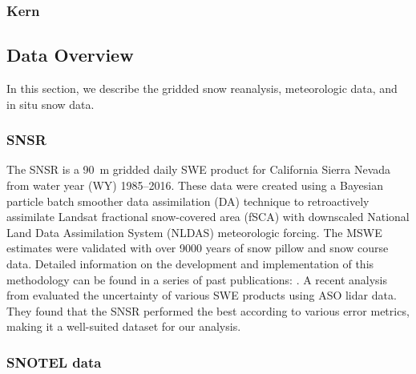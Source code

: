 \hypertarget{ch2-sa-3}{\subsubsection{Kern}\label{ch2-sa-3}}


\hypertarget{ch2-do-1}{\subsection{Data Overview}\label{ch2-do-1}}

In this section, we describe the gridded snow reanalysis, meteorologic data, and in situ snow data.

\hypertarget{ch2-do-2}{\subsubsection{SNSR}\label{ch2-do-2}}


The SNSR \citep{margulisLandsatEraSierraNevada2016} is a 90~m gridded daily SWE product for California Sierra Nevada from water year (WY) 1985--2016. These data were created using a Bayesian particle batch smoother data assimilation (DA) technique to retroactively assimilate Landsat fractional snow-covered area (fSCA) with downscaled National Land Data Assimilation System (NLDAS) meteorologic forcing. The MSWE estimates were validated with over 9000 years of snow pillow and snow course data. Detailed information on the development and implementation of this methodology can be found in a series of past publications: \cite{durandBayesianApproachSnow2008, girottoExaminingSpatialTemporal2014, girottoProbabilisticSWEReanalysis2014, margulisParticleBatchSmoother2015}. A recent analysis from \citep{yangIntercomparisonSnowWater2023} evaluated the uncertainty of various SWE products using ASO lidar data. They found that the SNSR performed the best according to various error metrics, making it a well-suited dataset for our analysis.

\hypertarget{ch2-do-2}{\subsubsection{SNOTEL data}\label{ch2-do-2}}

